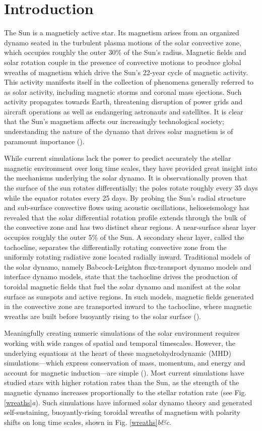 \documentclass[aasms,12pt]{article}
\begin{document}
\section{Introduction}
The Sun is a magneticly active star.  Its magnetism arises from an 
organized dynamo seated in the turbulent plasma
motions of the solar convective zone, which occupies roughly the outer 30\%
of the Sun's radius. Magnetic fields and solar rotation couple in the presence
of convective motions to produce global
wreaths of magnetism which drive the Sun's 22-year cycle of magnetic activity.
This activity manifests itself in the collection of phenomena generally
referred to as solar activity, including magnetic storms and coronal mass
ejections.  Such activity propagates towards Earth, threatening disruption of 
power
grids and aircraft operations as well as endangering astronauts and satellites.  It is
clear that the Sun's magnetism affects our increasingly technological society;
understanding the nature of the dynamo that drives solar magnetism is of
paramount importance (\citealt{Toomre2009, Charbonneau2014}).

While current simulations lack the power to predict accurately 
the stellar magnetic environment 
over long time scales, they have provided great insight into the mechanisms
underlying the solar dynamo.  
It is observationally proven that the surface of the sun rotates differentially;
the poles rotate roughly every 35 days while the equator rotates every 25
days.  By probing the Sun's
radial structure and sub-surface convective flows using acoustic oscillations,
helioseismology
has revealed that the solar differential rotation profile extends through the
bulk of the convective zone and has two distinct shear regions.  A near-surface
shear layer occupies roughly the outer 5\% of the Sun. A secondary shear
layer, called the tachocline, 
separates the differentially rotating convective zone from the uniformly
rotating radiative zone located radially inward.  
Traditional models of the solar dynamo, namely Babcock-Leighton flux-transport
dynamo models and interface dynamo models, state that the
tachocline drives the production of toroidal magnetic   
fields that fuel the solar dynamo and manifest at the solar surface as
sunspots and active regions.  In such models, magnetic fields generated
in the convective zone are transported inward to the tachocline, where
magnetic wreaths are built before buoyantly 
rising to the solar surface (\citealt{Toomre2009}).

Meaningfully creating numeric simulations of the 
solar environment requires working with wide ranges
of spatial and temporal timescales.  However, the
underlying equations at the heart of these magnetohydrodynamic (MHD) 
simulations---which express conservation of mass, momentum, and energy and
account for magnetic induction---are simple (\citealt{Charbonneau2014}).  Most current
simulations
have studied stars with higher rotation rates than the Sun, as the strength
of the magnetic dynamo increases proportionally to the stellar
rotation rate (see Fig.
\ref{wreaths}\emph{a}).  Such simulations
have informed solar dynamo theory and generated 
self-sustaining, buoyantly-rising toroidal wreaths of magnetism with polarity
shifts on long time scales,
shown in Fig. \ref{wreaths}\emph{b\&c}.  
\end{document}
